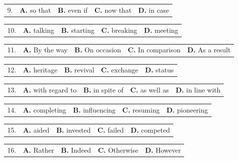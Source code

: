 \documentclass[UTF8,11pt]{ctexart}
\begin{document}
\noindent\begin{tabularx}{\linewidth}{@{}lXXXX@{}}9. & \textbf{A.} so that & \textbf{B.} even if & \textbf{C.} now that & \textbf{D.} in case\\\end{tabularx}\par

\noindent\begin{tabularx}{\linewidth}{@{}lXXXX@{}}10. & \textbf{A.} talking & \textbf{B.} starting & \textbf{C.} breaking & \textbf{D.} meeting\\\end{tabularx}\par

\noindent\begin{tabularx}{\linewidth}{@{}lXXXX@{}}11. & \textbf{A.} By the way & \textbf{B.} On occasion & \textbf{C.} In comparison & \textbf{D.} As a result\\\end{tabularx}\par

\noindent\begin{tabularx}{\linewidth}{@{}lXXXX@{}}12. & \textbf{A.} heritage & \textbf{B.} revival & \textbf{C.} exchange & \textbf{D.} status\\\end{tabularx}\par

\noindent\begin{tabularx}{\linewidth}{@{}lXXXX@{}}13. & \textbf{A.} with regard to & \textbf{B.} in spite of & \textbf{C.} as well as & \textbf{D.} in line with\\\end{tabularx}\par

\noindent\begin{tabularx}{\linewidth}{@{}lXXXX@{}}14. & \textbf{A.} completing & \textbf{B.} influencing & \textbf{C.} resuming & \textbf{D.} pioneering\\\end{tabularx}\par

\noindent\begin{tabularx}{\linewidth}{@{}lXXXX@{}}15. & \textbf{A.} aided & \textbf{B.} invested & \textbf{C.} failed & \textbf{D.} competed\\\end{tabularx}\par

\noindent\begin{tabularx}{\linewidth}{@{}lXXXX@{}}16. & \textbf{A.} Rather & \textbf{B.} Indeed & \textbf{C.} Otherwise & \textbf{D.} However\\\end{tabularx}\par
\end{document}

